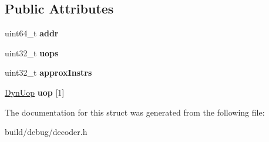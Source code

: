 \subsection*{Public Attributes}
\begin{DoxyCompactItemize}
\item 
\hypertarget{structDynBbl_abb71dd4e4dbdc3178f94b3d5b2742aab}{uint64\-\_\-t {\bfseries addr}}\label{structDynBbl_abb71dd4e4dbdc3178f94b3d5b2742aab}

\item 
\hypertarget{structDynBbl_a3f765e60798a5498d73f43a72984ecc8}{uint32\-\_\-t {\bfseries uops}}\label{structDynBbl_a3f765e60798a5498d73f43a72984ecc8}

\item 
\hypertarget{structDynBbl_a164ce491b4a0e15ed3f0a0ed9e23eb76}{uint32\-\_\-t {\bfseries approx\-Instrs}}\label{structDynBbl_a164ce491b4a0e15ed3f0a0ed9e23eb76}

\item 
\hypertarget{structDynBbl_a6c7cad6dd4ae2afea409e394b2428477}{\hyperlink{structDynUop}{Dyn\-Uop} {\bfseries uop} \mbox{[}1\mbox{]}}\label{structDynBbl_a6c7cad6dd4ae2afea409e394b2428477}

\end{DoxyCompactItemize}


The documentation for this struct was generated from the following file\-:\begin{DoxyCompactItemize}
\item 
build/debug/decoder.\-h\end{DoxyCompactItemize}
